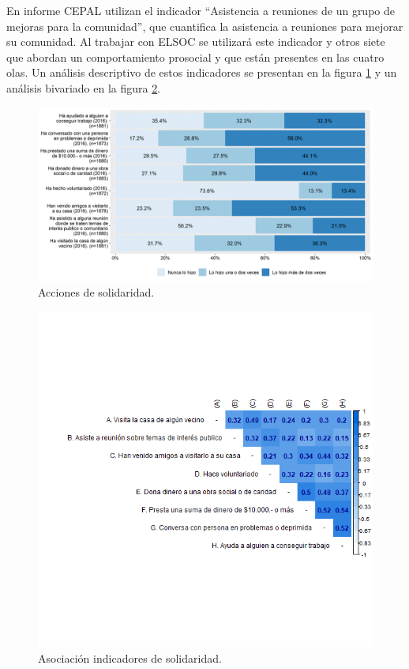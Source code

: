 \documentclass[
  12pt,
]{book}
\begin{document}
En informe CEPAL utilizan el indicador ``Asistencia a reuniones de un grupo de mejoras para la comunidad'', que cuantifica la asistencia a reuniones para mejorar su comunidad. Al trabajar con ELSOC se utilizará este indicador y otros siete que abordan un comportamiento prosocial y que están presentes en las cuatro olas. Un análisis descriptivo de estos indicadores se presentan en la figura \ref{fig:solidaridad} y un análisis bivariado en la figura \ref{fig:solidaridad-cor}.

\begin{figure}[H]

{\centering \includegraphics[width=1\linewidth,height=1\textheight]{output/graphs/solidaridad} 

}

\caption{Acciones de solidaridad.}\label{fig:solidaridad}
\end{figure}

\begin{figure}[H]

{\centering \includegraphics[width=1\linewidth,height=1\textheight]{output/graphs/solidaridad_cor} 

}

\caption{Asociación indicadores de solidaridad.}\label{fig:solidaridad-cor}
\end{figure}
\end{document}
